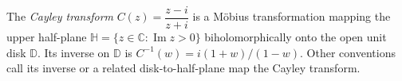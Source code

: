 
The \emph{Cayley transform} $C(z)=\dfrac{z-i}{z+i}$ is a Möbius transformation mapping the upper half-plane $\mathbb H=\{z\in\mathbb C:\operatorname{Im}z>0\}$ biholomorphically onto the open unit disk $\mathbb D$. Its inverse on $\mathbb D$ is $C^{-1}(w)=i(1+w)/(1-w)$. Other conventions call its inverse or a related disk-to-half-plane map the Cayley transform.

